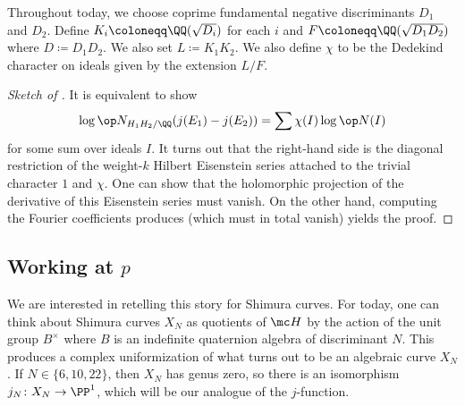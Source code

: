 \documentclass{article}
\begin{document}
Throughout today, we choose coprime fundamental negative discriminants $D_1$ and $D_2$. Define $K_i\coloneqq\QQ(\sqrt{D_i})$ for each $i$ and $F\coloneqq\QQ(\sqrt{D_1D_2})$ where $D\coloneqq D_1D_2$. We also set $L\coloneqq K_1K_2$. We also define $\chi$ to be the Dedekind character on ideals given by the extension $L/F$.
\begin{proof}[Sketch of ]
	It is equivalent to show
	\[\log\op N_{H_1H_2/\QQ}(j(E_1)-j(E_2))=\sum\chi(I)\log\op N(I)\]
	for some sum over ideals $I$. It turns out that the right-hand side is the diagonal restriction of the weight-$k$ Hilbert Eisenstein series attached to the trivial character $1$ and $\chi$. One can show that the holomorphic projection of the derivative of this Eisenstein series must vanish. On the other hand, computing the Fourier coefficients produces (which must in total vanish) yields the proof.
\end{proof}

\subsection{Working at \texorpdfstring{$p$}{p}}
We are interested in retelling this story for Shimura curves. For today, one can think about Shimura curves $X_N$ as quotients of $\mc H$ by the action of the unit group $B^\times$ where $B$ is an indefinite quaternion algebra of discriminant $N$. This produces a complex uniformization of what turns out to be an algebraic curve $X_N$. If $N\in\{6,10,22\}$, then $X_N$ has genus zero, so there is an isomorphism $j_N\colon X_N\to\PP^1$, which will be our analogue of the $j$-function.
\end{document}
